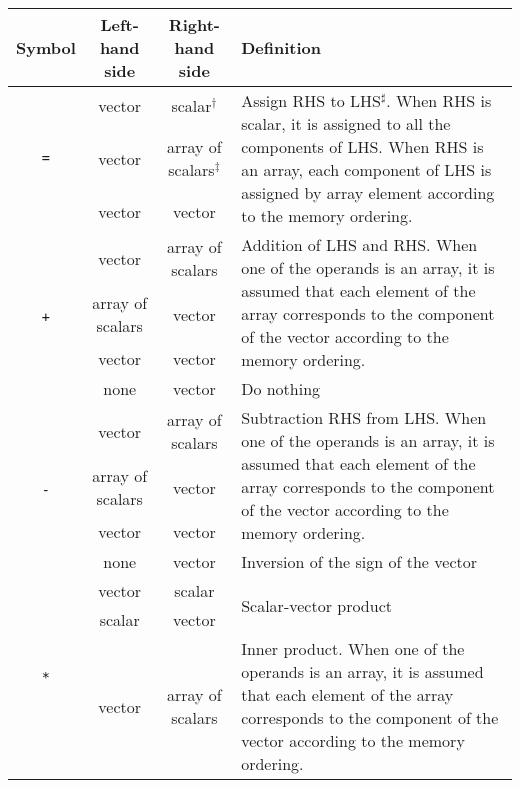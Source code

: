 \begin{table}[H]
\begin{tabularx}{\linewidth}{|c|c|c|X|}
\toprule
\rowcolor{Snow2}
Symbol & Left-hand side & Right-hand side & Definition \\
\midrule
\multirow{3}{*}{\texttt{=}} & vector & scalar$^{\dagger}$ & \multirow{3}{\hsize}{\footnotesize Assign RHS to LHS$^{\sharp}$. When RHS is scalar, it is assigned to all the components of LHS. When RHS is an array, each component of LHS is assigned by array element according to the memory ordering.} \\[2pt]
\cmidrule(r){2-3}
 & vector & array of scalars$^{\ddagger}$ &  \\[2pt]
\cmidrule(r){2-3}
 & vector & vector &  \\[2pt]
\midrule
\multirow{4}{*}{\texttt{+}} & vector & array of scalars & \multirow{3}{\hsize}{\footnotesize Addition of LHS and RHS. When one of the operands is an array, it is assumed that each element of the array corresponds to the component of the vector according to the memory ordering.} \\[2pt]
\cmidrule(r){2-3}
 & array of scalars & vector & \\[2pt]
\cmidrule(r){2-3}
 & vector & vector & \\[2pt]
\cmidrule(r){2-4}
 & none & vector & Do nothing \\
\midrule
\multirow{4}{*}{\texttt{-}} & vector & array of scalars & \multirow{3}{\hsize}{\footnotesize Subtraction RHS from LHS. When one of the operands is an array, it is assumed that each element of the array corresponds to the component of the vector according to the memory ordering.} \\[2pt]
\cmidrule(r){2-3}
& array of scalars & vector &  \\[2pt]
\cmidrule(r){2-3}
& vector & vector & \\[2pt]
\cmidrule(r){2-4}
& none & vector & Inversion of the sign of the vector \\
\midrule
\multirow{5}{*}{\texttt{*}} & vector & scalar & \multirow{2}{*}{Scalar-vector product} \\
\cmidrule(r){2-3}
 & scalar & vector & \\
\cmidrule(r){2-4}
 & vector & array of scalars & \multirow{3}{\hsize}{\footnotesize Inner product. When one of the operands is an array, it is assumed that each element of the array corresponds to the component of the vector according to the memory ordering.} \\

\end{tabularx}
\end{table}
